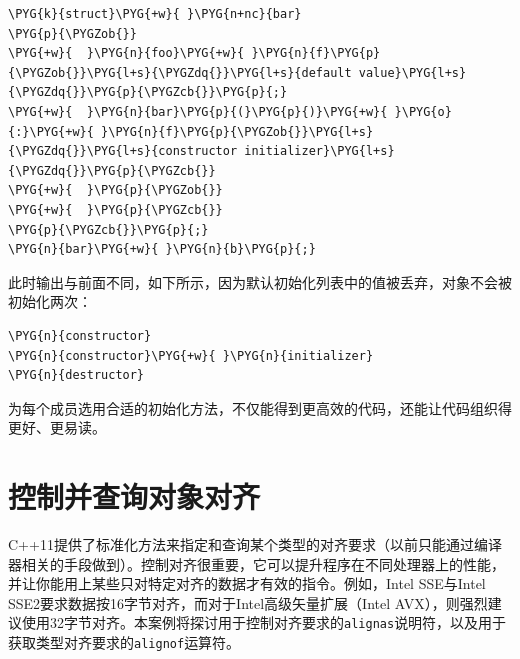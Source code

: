 
\begin{codeblockbg}
\begin{Verbatim}[commandchars=\\\{\},breaklines=true,breakanywhere=true,fontsize=\codefont,xleftmargin=17bp]
\PYG{k}{struct}\PYG{+w}{ }\PYG{n+nc}{bar}
\PYG{p}{\PYGZob{}}
\PYG{+w}{  }\PYG{n}{foo}\PYG{+w}{ }\PYG{n}{f}\PYG{p}{\PYGZob{}}\PYG{l+s}{\PYGZdq{}}\PYG{l+s}{default value}\PYG{l+s}{\PYGZdq{}}\PYG{p}{\PYGZcb{}}\PYG{p}{;}
\PYG{+w}{  }\PYG{n}{bar}\PYG{p}{(}\PYG{p}{)}\PYG{+w}{ }\PYG{o}{:}\PYG{+w}{ }\PYG{n}{f}\PYG{p}{\PYGZob{}}\PYG{l+s}{\PYGZdq{}}\PYG{l+s}{constructor initializer}\PYG{l+s}{\PYGZdq{}}\PYG{p}{\PYGZcb{}}
\PYG{+w}{  }\PYG{p}{\PYGZob{}}
\PYG{+w}{  }\PYG{p}{\PYGZcb{}}
\PYG{p}{\PYGZcb{}}\PYG{p}{;}
\PYG{n}{bar}\PYG{+w}{ }\PYG{n}{b}\PYG{p}{;}
\end{Verbatim}
\end{codeblockbg}



此时输出与前面不同，如下所示，因为默认初始化列表中的值被丢弃，对象不会被初始化两次：



\begin{codeblockbg}
\begin{Verbatim}[commandchars=\\\{\},breaklines=true,breakanywhere=true,fontsize=\codefont,xleftmargin=17bp]
\PYG{n}{constructor}
\PYG{n}{constructor}\PYG{+w}{ }\PYG{n}{initializer}
\PYG{n}{destructor}
\end{Verbatim}
\end{codeblockbg}



\begin{myNote}[tip]
为每个成员选用合适的初始化方法，不仅能得到更高效的代码，还能让代码组织得更好、更易读。
\end{myNote}



\section{控制并查询对象对齐}



C++11提供了标准化方法来指定和查询某个类型的对齐要求（以前只能通过编译器相关的手段做到）。控制对齐很重要，它可以提升程序在不同处理器上的性能，并让你能用上某些只对特定对齐的数据才有效的指令。例如，Intel SSE与Intel SSE2要求数据按16字节对齐，而对于Intel高级矢量扩展（Intel AVX），则强烈建议使用32字节对齐。本案例将探讨用于控制对齐要求的\texttt{alignas}说明符，以及用于获取类型对齐要求的\texttt{alignof}运算符。


